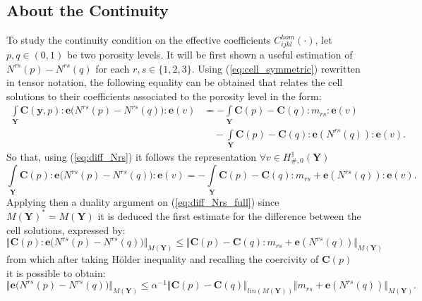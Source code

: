 \subsection{About the Continuity}

To study the continuity condition on the effective coefficients $C^{hom}_{ijkl}(\cdot)$, let $p, q \in (0,1)$ be two porosity levels. It will be first shown a useful estimation of $N^{rs}(p)-N^{rs}(q)$ for each $r,s \in \{1,2,3\}$. 
Using (\ref{eq:cell_symmetric}) rewritten in tensor notation, the following equality can be obtained that relates the cell solutions to their coefficients associated to the porosity level in the form:
\begin{equation}
    \label{eq:diff_Nrs}
    \begin{aligned}
        \int\limits_{\mathbf{Y}} \mathbf{C}(\mathbf{y},p):\mathbf{e}\big( N^{rs}(p)-N^{rs}(q) \big) : \mathbf{e}(v) & =  -\int\limits_{\mathbf{Y}} \mathbf{C}(p)-\mathbf{C}(q) : m_{rs}:\mathbf{e}(v) \\
        & \quad - \int\limits_{\mathbf{Y}}\mathbf{C}(p)-\mathbf{C}(q):\mathbf{e}(N^{rs}(q)):\mathbf{e}(v).
    \end{aligned}
\end{equation}
So that, using (\ref{eq:diff_Nrs}) it follows the representation $\forall v \in H^1_{\#,0}(\mathbf{Y})$
\begin{equation}
    \label{eq:diff_Nrs_full}
    \int\limits_{\mathbf{Y}} \mathbf{C}(p):\mathbf{e}\big(N^{rs}(p)-N^{rs}(q)\big):\mathbf{e}(v) = -\int\limits_{\mathbf{Y}} \mathbf{C}(p)-\mathbf{C}(q):m_{rs}+\mathbf{e}(N^{rs}(q)):\mathbf{e}(v).
\end{equation}
Applying then a duality argument on (\ref{eq:diff_Nrs_full}) since $M(\mathbf{Y})^* = M(\mathbf{Y})$ it is deduced the first estimate for the difference between the cell solutions, expressed by:
\begin{equation*}
    \Vert \mathbf{C}(p):\mathbf{e}\big(N^{rs}(p)-N^{rs}(q)\big) \Vert_{M(\mathbf{Y})} \leq \Vert \mathbf{C}(p)-\mathbf{C}(q):m_{rs}+\mathbf{e}(N^{rs}(q))\Vert_{M(\mathbf{Y})}
\end{equation*}
from which after taking H\"{o}lder inequality and recalling the coercivity of $\mathbf{C}(p)$ it is possible to obtain:
\begin{equation}
    \label{eq:ineq_diff_N}
    \Vert \mathbf{e}\big(N^{rs}(p)-N^{rs}(q)\big) \Vert_{M(\mathbf{Y})} \leq \alpha^{-1}\Vert \mathbf{C}(p)-\mathbf{C}(q) \Vert_{lin (M(\mathbf{Y}))} \Vert m_{rs}+\mathbf{e}(N^{rs}(q)) \Vert_{M(\mathbf{Y})}.
\end{equation}

